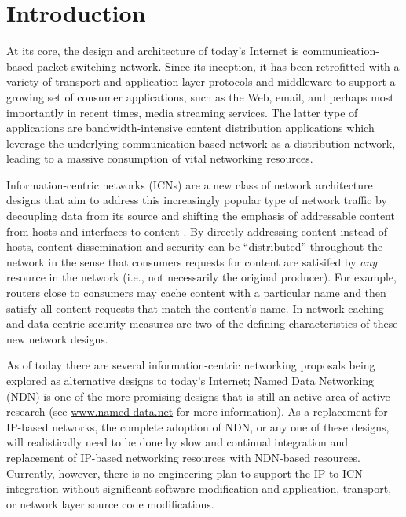 \section{Introduction}
At its core, the design and architecture of today's Internet is communication-based packet switching network. Since its inception, it has been retrofitted with a variety of transport and application layer protocols and middleware to support a growing set of consumer applications, such as the Web, email, and perhaps most importantly in recent times, media streaming services. The latter type of applications are bandwidth-intensive content distribution applications which leverage the underlying communication-based network as a distribution network, leading to a massive consumption of vital networking resources. 

Information-centric networks (ICNs) are a new class of network architecture designs that aim to address this increasingly popular type of network traffic by decoupling data from its source and shifting the emphasis of addressable content from hosts and interfaces to content \cite{first}. By directly addressing content instead of hosts, content dissemination and security can be ``distributed'' throughout the network in the sense that consumers requests for content are satisifed by \emph{any} resource in the network (i.e., not necessarily the original producer). For example, routers close to consumers may cache content with a particular name and then satisfy all content requests that match the content's name. In-network caching and data-centric security measures are two of the defining characteristics of these new network designs. 

As of today there are several information-centric networking proposals being explored as alternative designs to today's Internet; Named Data Networking (NDN) \cite{ndn-techreport} is one of the more promising designs that is still an active area of active research (see \url{www.named-data.net} for more information). As a replacement for IP-based networks, the complete adoption of NDN, or any one of these designs, will realistically need to be done by slow and continual integration and replacement of IP-based networking resources with NDN-based resources. Currently, however, there is no engineering plan to support the IP-to-ICN integration without significant software modification and application, transport, or network layer source code modifications.

